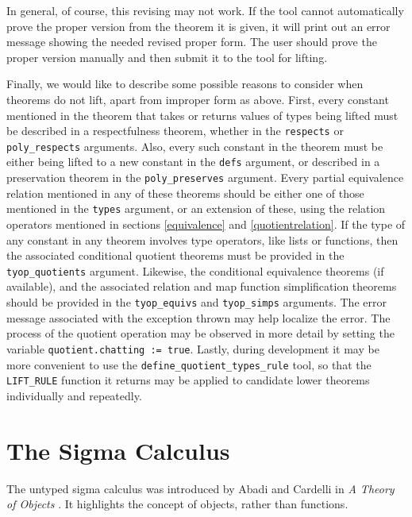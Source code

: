 \documentclass[envcountsame,runningheads]{llncs}
\begin{document}
In general, of course, this revising may not work.
If the tool cannot automatically prove the proper version from the theorem
it is given, it will print out an error message showing the needed revised
proper form.  The user should prove the proper version manually
and then submit
it
to the tool for lifting.

Finally, we would like to describe some possible reasons to consider
when theorems do not lift, apart from improper form as above.  First,
every constant mentioned in the theorem that takes or returns values
of types being lifted must be described in a respectfulness theorem,
whether in the {\tt respects} or {\tt poly\_respects} arguments.
Also, every such constant in the theorem
must be either being lifted to a new constant in the {\tt defs} argument,
or described in a preservation theorem in the {\tt poly\_preserves} argument.
Every partial equivalence relation mentioned in any of these theorems
should be either one of those mentioned in the {\tt types} argument,
or an extension of these,
using the relation operators mentioned in sections
\ref{equivalence} and
\ref{quotientrelation}.
If the type of any constant in any theorem
involves type operators, like lists or functions, then the associated
conditional quotient theorems must be provided in the
{\tt tyop\_quotients} argument.
Likewise, the conditional equivalence theorems (if available),
and the associated relation and map function simplification theorems
should be provided
in the {\tt tyop\_equivs} and {\tt tyop\_simps} arguments.
The error message associated with the exception thrown may help localize
the error.
The process of the quotient operation may be observed in more detail
by setting the variable {\tt quotient.chatting := true}.
Lastly, during development it may be more convenient to use the
{\tt define\_quotient\_types\_rule} tool, so that the {\tt LIFT\_RULE}
function it returns may be applied to candidate lower theorems individually
and repeatedly.


%
\section{The Sigma Calculus}
%
\label{sigmacalculus}

The untyped sigma calculus was introduced by Abadi and Cardelli in
{\it A Theory of Objects} \cite{AbCa96}.
It highlights the concept of objects,
rather than functions.
\end{document}
